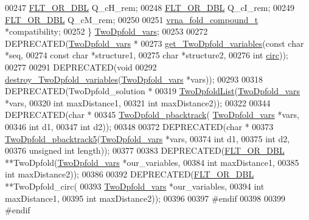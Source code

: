 \begin{DoxyCode}
00247   \mbox{\hyperlink{group__data__structures_ga31125aeace516926bf7f251f759b6126}{FLT\_OR\_DBL}}      Q\_cH\_rem;
00248   \mbox{\hyperlink{group__data__structures_ga31125aeace516926bf7f251f759b6126}{FLT\_OR\_DBL}}      Q\_cI\_rem;
00249   \mbox{\hyperlink{group__data__structures_ga31125aeace516926bf7f251f759b6126}{FLT\_OR\_DBL}}      Q\_cM\_rem;
00250 
00251   \mbox{\hyperlink{group__fold__compound_structvrna__fc__s}{vrna\_fold\_compound\_t}} *compatibility;
00252 \} \mbox{\hyperlink{structTwoDpfold__vars}{TwoDpfold\_vars}};
00253 
00272 DEPRECATED(\mbox{\hyperlink{structTwoDpfold__vars}{TwoDpfold\_vars}}  *
00273 \mbox{\hyperlink{2Dpfold_8h_a1aca740e2a75ab2b2951538266e53d64}{get\_TwoDpfold\_variables}}(\textcolor{keyword}{const} \textcolor{keywordtype}{char} *seq,
00274                         \textcolor{keyword}{const} \textcolor{keywordtype}{char} *structure1,
00275                         \textcolor{keywordtype}{char} *structure2,
00276                         \textcolor{keywordtype}{int} \mbox{\hyperlink{group__model__details_gaf9202a1a09f5828dc731e2d9a10fa111}{circ}}));
00277 
00291 DEPRECATED(\textcolor{keywordtype}{void} 
00292 \mbox{\hyperlink{2Dpfold_8h_afe994291458ee2ac34d3eb825ef62a15}{destroy\_TwoDpfold\_variables}}(\mbox{\hyperlink{structTwoDpfold__vars}{TwoDpfold\_vars}} *vars));
00293 
00318 DEPRECATED(TwoDpfold\_solution  *
00319 \mbox{\hyperlink{2Dpfold_8h_a692243dac482a1e158a8e1b7881cfda2}{TwoDpfoldList}}(\mbox{\hyperlink{structTwoDpfold__vars}{TwoDpfold\_vars}} *vars,
00320               \textcolor{keywordtype}{int} maxDistance1,
00321               \textcolor{keywordtype}{int} maxDistance2));
00322 
00344 DEPRECATED(\textcolor{keywordtype}{char} *
00345 \mbox{\hyperlink{2Dpfold_8h_ae251288f50dd4ae7d315af0085775f71}{TwoDpfold\_pbacktrack}}( \mbox{\hyperlink{structTwoDpfold__vars}{TwoDpfold\_vars}} *vars,
00346                       \textcolor{keywordtype}{int} d1,
00347                       \textcolor{keywordtype}{int} d2));
00348 
00372 DEPRECATED(\textcolor{keywordtype}{char} *
00373 \mbox{\hyperlink{2Dpfold_8h_a13430ac6a7f90df426774f131647d2c7}{TwoDpfold\_pbacktrack5}}(\mbox{\hyperlink{structTwoDpfold__vars}{TwoDpfold\_vars}} *vars,
00374                       \textcolor{keywordtype}{int} d1,
00375                       \textcolor{keywordtype}{int} d2,
00376                       \textcolor{keywordtype}{unsigned} \textcolor{keywordtype}{int} length));
00377 
00383 DEPRECATED(\mbox{\hyperlink{group__data__structures_ga31125aeace516926bf7f251f759b6126}{FLT\_OR\_DBL}}          **TwoDpfold(\mbox{\hyperlink{structTwoDpfold__vars}{TwoDpfold\_vars}} *our\_variables,
00384                                 \textcolor{keywordtype}{int} maxDistance1,
00385                                 \textcolor{keywordtype}{int} maxDistance2));
00386 
00392 DEPRECATED(\mbox{\hyperlink{group__data__structures_ga31125aeace516926bf7f251f759b6126}{FLT\_OR\_DBL}}          **TwoDpfold\_circ(
00393                                 \mbox{\hyperlink{structTwoDpfold__vars}{TwoDpfold\_vars}} *our\_variables,
00394                                 \textcolor{keywordtype}{int} maxDistance1,
00395                                 \textcolor{keywordtype}{int} maxDistance2));
00396 
00397 \textcolor{preprocessor}{#endif}
00398 
00399 \textcolor{preprocessor}{#endif}
\end{DoxyCode}
